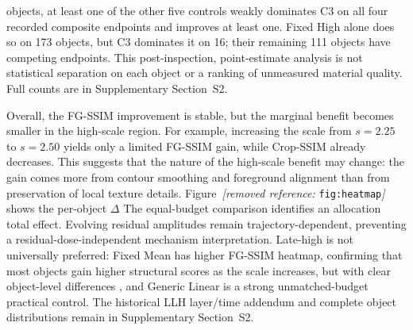 \documentclass[times,twocolumn,final]{elsarticle}
\providecommand{\DIFadd}[1]{{\protect\color{blue} \sf #1}} %
\providecommand{\DIFdel}[1]{{\protect\color{red} \scriptsize #1}} %
\providecommand{\DIFaddbegin}{} %
\providecommand{\DIFaddend}{} %
\providecommand{\DIFdelbegin}{} %
\providecommand{\DIFdelend}{} %
\begin{document}
\DIFdelend \DIFaddbegin \DIFadd{300 objects, at least one of the other five controls weakly dominates C3 on all four recorded composite endpoints and improves at least one. Fixed High alone does so on 173 objects, but C3 dominates it on 16; their remaining 111 objects have competing endpoints. This post-inspection, point-estimate analysis is not statistical separation on each object or a ranking of unmeasured material quality. Full counts are in Supplementary Section~S2.
}\DIFaddend 

\DIFdelbegin \DIFdel{Overall, the FG-SSIM improvement is stable, but the marginal benefit becomes smaller in the high-scale region. For example, increasing the scale from $s = 2.25$ to $s = 2.50$ yields only a limited FG-SSIM gain, while Crop-SSIM already decreases. This suggests that the nature of the high-scale benefit may change: the gain comes more from contour smoothing and foreground alignment than from preservation of local texture details. Figure~\textit{[removed reference: }\texttt{fig:heatmap}\textit{]} shows the per-object $\Delta$}\DIFdelend \DIFaddbegin \DIFadd{The equal-budget comparison identifies an allocation total effect. Evolving residual amplitudes remain trajectory-dependent, preventing a residual-dose-independent mechanism interpretation. Late-high is not universally preferred: Fixed Mean has higher }\DIFaddend FG-SSIM\DIFdelbegin \DIFdel{heatmap, confirming that most objects gain higher structural scores as the scale increases, but with clear object-level differences}\DIFdelend \DIFaddbegin \DIFadd{, and Generic Linear is a strong unmatched-budget practical control. The historical LLH layer/time addendum and complete object distributions remain in Supplementary Section~S2}\DIFaddend .
\end{document}
